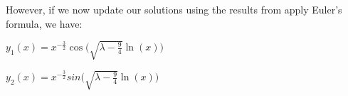 \documentclass[executivepaper]{article}
\begin{document}
\begin{flushleft}
\begin{center}
\end{center}

However, if we now update our solutions using the results from apply Euler's formula, we have:

\begin{center}

$y_{1}(x)=x^{-\frac{3}{2}}\cos\bigg(\sqrt{\lambda-\frac{9}{4}} \ln(x)\bigg)$

\hspace{1mm}

$y_{2}(x)=x^{-\frac{3}{2}}sin\bigg(\sqrt{\lambda-\frac{9}{4}} \ln(x)\bigg)$

\end{center}

\end{flushleft}
\end{document}
